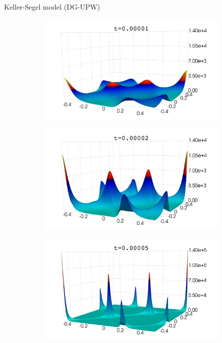 		\begin{frame}{Keller-Segel model (DG-UPW)}
			\begin{figure}[t]
			\centering
			\begin{subfigure}{0.49\textwidth}
				\centering
				\includegraphics[scale=0.07]{img/ks/u-1_sin-cos.pdf}
			\end{subfigure}
			\begin{subfigure}{0.49\textwidth}
				\centering
				\includegraphics[scale=0.07]{img/ks/u-2_sin-cos.pdf}
			\end{subfigure}
			\begin{subfigure}{0.49\textwidth}
				\centering
				\includegraphics[scale=0.07]{img/ks/u-5_sin-cos.pdf}

\end{subfigure}
\end{figure}
\end{frame}
